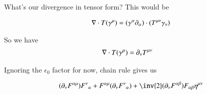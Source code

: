 \documentclass{article}
\begin{document}
What's our divergence in tensor form?  This would be

\begin{align*}
\nabla \cdot T(\gamma^\mu)
&= (\gamma^\alpha \partial_\alpha ) \cdot (T^{\mu\nu} \gamma_\nu) \\
\end{align*}

So we have
\begin{align}
\nabla \cdot T(\gamma^\mu)
&= \partial_\nu T^{\mu\nu}
\end{align}

Ignoring the $\epsilon_0$ factor for now, chain rule gives us

\begin{align*}
(\partial_\nu F^{\alpha\mu}) {F^{\nu}}_{\alpha} + 
F^{\alpha\mu} (\partial_\nu {F^{\nu}}_{\alpha}) + 
\inv{2} (\partial_\nu F^{\alpha\beta}) F_{\alpha\beta} \eta^{\mu\nu} 
\end{align*}



\end{document}
